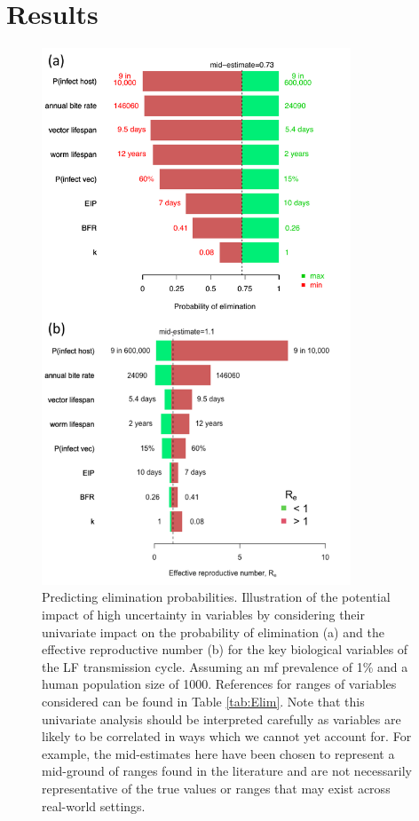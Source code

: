 \section[Results]{Results}

\begin{figure}
    \centering
    \includegraphics[height=16cm]{Project/Figures/LFElimination/Figure4.pdf}
    \caption[Univariate analysis of elimination probability and $R_e$.]{Predicting elimination probabilities. Illustration of the potential impact of high uncertainty in variables by considering their univariate impact on the probability of elimination (a) and the effective reproductive number (b) for the key biological variables of the LF transmission cycle. Assuming an mf prevalence of 1\% and a human population size of 1000. References for ranges of variables considered can be found in Table \ref{tab:Elim}. Note that this univariate analysis should be interpreted carefully as variables are likely to be correlated in ways which we cannot yet account for. For example, the mid-estimates here have been chosen to represent a mid-ground of ranges found in the literature and are not necessarily representative of the true values or ranges that may exist across real-world settings.}
    \label{fig:Elim_4}
\end{figure}

